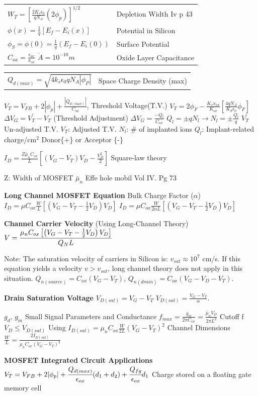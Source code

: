 \begin{multicols}{3}
\begin{tabular}{p{4.4cm}p{4.2cm}}
$W_T=\left[\frac{2K_s\epsilon_0}{qN_A}(2\phi_p)\right]^{1/2}$ & Depletion Width Iv p 43 
\\
$\phi(x)=\frac{1}{q}[E_f-E_i(x)]$ & Potential in Silicon \\
%
$\phi_S=\phi(0)=\frac{1}{q}(E_f-E_i(0))$ & Surface Potential \\
%
%
$C_{ox}=\frac{\epsilon_{ox}}{x_{ox}}$ $\dot{A} = 10^{-10} m$ & Oxide Layer Capacitance \\
\end{tabular}
\begin{tabular}{p{4.4cm}p{4.4cm}}
$Q_{d(max)}=\sqrt{4k_s\epsilon_0qN_A|\phi_P|}$ & Space Charge Density (max) \\
\end{tabular}
$V_T =V_{FB}+2|\phi_p| + \frac{|Q_{d(max)}|}{C_{ox}}$, Threshold Voltage(T.V.) \hfill \linebreak
$V_T=2\phi_F-\frac{K_s x_{ox}}{K_{ox}} 
\left[\frac{4qN_A}{K_S \epsilon_0}\phi_F\right]$
\hfill \break
$\Delta V_G=V_T^\prime-V_T$ (Threshold Adjustment)
$\Delta V_G= \frac{-Q_l}{C_{ox}}$ $Q_l=\pm qN_l 
\rightarrow N_l = \pm \frac{Q_l}{q}$ $V_T^\prime$ Un-adjusted T.V. $V_T$: Adjusted T.V. $N_l$: \# of implanted ions $Q_l$: Implant-related charge/$\text{cm}^2$  Donor\{+\} or Acceptor \{-\}

$I_D = \frac{Z \bar{\mu}_n C_{ox}}{L} \left[(V_G-V_T)V_D - \frac{V_D^2}{2}\right]$ Square-law theory

Z: Width of MOSFET $\bar{\mu}_n$ Effe hole mobil Vol IV. Pg 73

\textbf{Long Channel MOSFET Equation} Bulk Charge Factor ($\alpha$) %
$I_D= \mu C_{ox}\frac{W}{L} \left[\left(V_G-V_T-\frac{1}{2}V_D\right)V_D\right]$ \hfill \break 
$I_D= \mu C_{ox}\frac{W}{2\alpha L} \left[\left(V_G-V_T-\frac{1}{2}V_D\right)V_D\right]$

\textbf{Channel Carrier Velocity} (Using Long-Channel Theory)
$V=\cfrac{\mu_n C_{ox}\left[\left(V_G-V_T-\frac{1}{2}V_D\right)V_D\right]}{Q_NL}$

Note: The saturation velocity of carriers in Silicon is: $v_{sat} \approx 10^7$ cm/s.
If this equation yields a velocity $v > v_{sat}$, long channel theory does not apply in this situation. $Q_{n(source)}=C_{ox}(V_G-V_T)$, $Q_{n(drain)}=C_{ox}(V_G-V_D-V_T)$.

\textbf{Drain Saturation Voltage}
$V_{D(sat)}=V_G-V_T$ $V_{D(sat)}=\frac{V_G-V_T}{\alpha}$.
\vspace*{-0.4cm}
\begin{flushright}
$g_d$, $g_m$ Small Signal Parameters and Conductance %
$f_{max}=\frac{g_m}{2\pi C_{ox}}=\frac{\bar{\mu}_nV_D}{2\pi L^2}$ Cutoff f $V_D \leq V_{D(sat)}$ \break
Using $I_{D(sat)}=\mu_nC_{ox}\frac{W}{2L}(V_G-V_T)^2$ \linebreak
%
Channel Dimensions $\frac{W}{L}=\frac{2I_{D(sat)}}{\mu_nC_{ox}(V_G-V_T)^2}$
\end{flushright}
\textbf{MOSFET Integrated Circuit Applications} \hfill \break 
$V_T=V_{FB}+2|\phi_p|+\cfrac{Q_{d(max)}}{\epsilon_{ox}}(d_1+d_2)+\cfrac{Q_{fg}}{\epsilon_{ox}}d_1$ 
Charge stored on a floating gate memory cell


\end{multicols}
